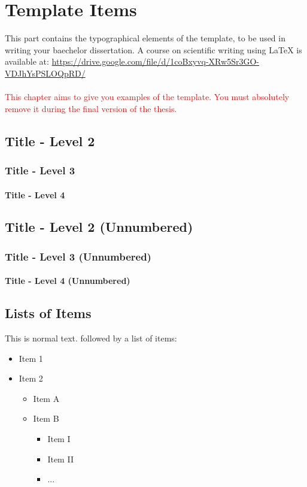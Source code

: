 \chapter{Template Items} \label{chap:template}

This part contains the typographical elements of the template, to be used in writing your baechelor dissertation. A course on scientific writing using \LaTeX{} is available at:
\url{https://drive.google.com/file/d/1coBxyvq-XRw5Sr3GO-VDJhYsPSLOQpRD/}
\\
\\
\textcolor{red}{
	This chapter aims to give you examples of the template. You must absolutely remove it during the final version of the thesis.
}

\section{Title - Level 2} \label{sec:example}
\subsection{Title - Level 3}
\subsubsection{Title - Level 4}

\section*{Title - Level 2 (Unnumbered)}
\subsection*{Title - Level 3 (Unnumbered)}
\subsubsection*{Title - Level 4 (Unnumbered)}

\section{Lists of Items}
This is normal text. followed by a list of items:

\firmlist
\begin{itemize}
	\item Item 1	
	\item Item 2
	\begin{itemize}
		\item Item A
		\item Item B
		\begin{itemize}
			\item Item I
			\item Item II
			\item ...
		\end{itemize}
	\end{itemize}
\end{itemize}

